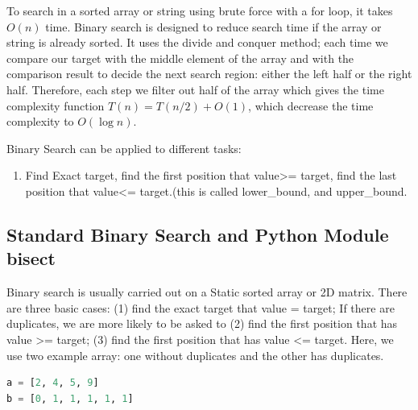 \documentclass[../searching.tex]{subfiles}
\begin{document}
To search in a sorted array or string using brute force with a for loop, it takes $O(n)$ time. Binary search is designed to reduce search time if the array or string is already sorted. It uses the divide and conquer method; each time we compare our target with the middle element of the array and with the comparison result to decide the next search region: either the left half or the right half. Therefore, each step we filter out half of the array which gives the time complexity function $T(n) = T(n/2) + O(1)$, which decrease the time complexity to $O(\log n)$.

Binary Search can be applied to different tasks:
\begin{enumerate}
    \item Find Exact target, find the first position that value>= target, find the last position that value<= target.(this is called lower\_bound, and upper\_bound. 
\end{enumerate}

\subsection{Standard Binary Search and Python Module bisect}
Binary search is usually carried out on a Static sorted array or 2D matrix. There are three basic cases: (1) find the exact target that value = target; If there are duplicates, we are more likely to be asked to (2) find the first position that has value >= target; (3) find the first position that has value <= target. Here, we use two example array: one without duplicates and the other has duplicates.
\begin{lstlisting}[language=Python]
a = [2, 4, 5, 9]
b = [0, 1, 1, 1, 1, 1]
\end{lstlisting}
\end{document}
